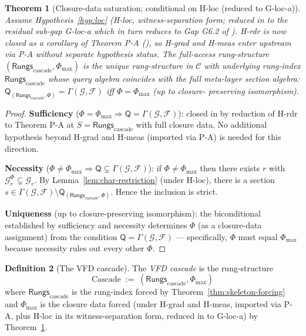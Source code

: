 \documentclass[11pt, a4paper]{amsart}
\newtheorem{theorem}{Theorem}[section]
\theoremstyle{definition}
\newtheorem{definition}[theorem]{Definition}
\newcommand{\Rungs}{\mathsf{Rungs}}
\newcommand{\catC}{\mathcal{C}}
\newcommand{\Fcal}{\mathcal{F}}
\newcommand{\Gcal}{\mathcal{G}}
\newcommand{\Qalg}{\mathsf{Q}}
\begin{document}
\begin{theorem}[Closure-data saturation; conditional on H-loc
  (reduced to G-loc-a)]
\label{thm:closure-saturation}
Assume Hypothesis~\ref{hyp:loc} (H-loc, witness-separation form;
reduced in \cite{CascadeHlocClosure} to the residual sub-gap
G-loc-a which in turn reduces to Gap G6.2 of
\cite{CascadeObserverQueryAlgebra}). H-rdr is now closed as a
corollary of Theorem P-A (\cite{CascadeHrdrClosure}), so H-grad
and H-meas enter upstream via P-A without separate hypothesis
status. The full-access
rung-structure $(\Rungs_{\mathrm{cascade}}, \Phi_{\max})$ is
the unique rung-structure in $\catC$ with underlying rung-index
$\Rungs_{\mathrm{cascade}}$ whose query algebra coincides with
the full meta-layer section algebra:
$\Qalg_{(\Rungs_{\mathrm{cascade}}, \Phi)} =
\Gamma(\Gcal, \Fcal)$ iff $\Phi = \Phi_{\max}$ (up to closure-
preserving isomorphism).
\end{theorem}

\begin{proof}
\textbf{Sufficiency} ($\Phi = \Phi_{\max} \Rightarrow \Qalg =
\Gamma(\Gcal, \Fcal)$): closed in \cite{CascadeHrdrClosure}
by reduction of H-rdr to Theorem P-A at $S =
\Rungs_{\mathrm{cascade}}$ with full closure data. No
additional hypothesis beyond H-grad and H-meas (imported via
P-A) is needed for this direction.

\textbf{Necessity} ($\Phi \ne \Phi_{\max} \Rightarrow \Qalg
\subsetneq \Gamma(\Gcal, \Fcal)$): if $\Phi \ne \Phi_{\max}$
then there exists $r$ with $\Gcal_r^\Phi \subsetneq \Gcal_r$.
By Lemma~\ref{lem:char-restriction} (under H-loc), there is a
section $s \in \Gamma(\Gcal, \Fcal) \setminus
\Qalg_{(\Rungs_{\mathrm{cascade}}, \Phi)}$. Hence the
inclusion is strict.

\textbf{Uniqueness} (up to closure-preserving isomorphism):
the biconditional established by sufficiency and necessity
determines $\Phi$ (as a closure-data assignment) from the
condition $\Qalg = \Gamma(\Gcal, \Fcal)$ — specifically,
$\Phi$ must equal $\Phi_{\max}$ because necessity rules out
every other $\Phi$.
\end{proof}

\begin{definition}[The VFD cascade]
\label{def:cascade-structure}
The \emph{VFD cascade} is the rung-structure
\[
    \mathrm{Cascade} \;:=\; (\Rungs_{\mathrm{cascade}},
      \Phi_{\max})
\]
where $\Rungs_{\mathrm{cascade}}$ is the rung-index forced by
Theorem~\ref{thm:skeleton-forcing} and $\Phi_{\max}$ is the
closure data forced (under H-grad and H-meas, imported via
P-A, plus H-loc in its witness-separation form, reduced in
\cite{CascadeHlocClosure} to G-loc-a) by
Theorem~\ref{thm:closure-saturation}.
\end{definition}
\end{document}
